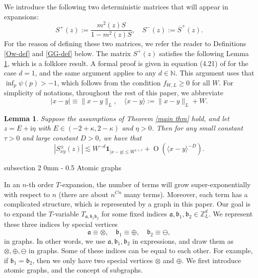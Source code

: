 \documentclass{article}
\makeatletter
\newcommand{\1}{\mathds{1}}
\numberwithin{equation}{section}
\newcommand{\be}{\begin{equation}}
\newcommand{\ee}{\end{equation}}
\newcommand{\fa}{{\mathfrak a}}
\newcommand{\fb}{{\mathfrak b}}
\newcommand{\ii}{\mathrm{i}} %
\renewcommand{\leq}{\leqslant}
\renewcommand{\geq}{\geqslant}
\renewcommand{\le}{\leq}
\renewcommand{\ge}{\geq}
\newcommand{\N}{\mathbb{N}}
\newcommand{\Z}{\mathbb{Z}}
\DeclareMathOperator{\OO}{O}
\theoremstyle{plain} %
\newtheorem{lemma}[theorem]{Lemma}
\theoremstyle{remark}
\renewcommand{\subsection}{\@startsection
	{subsection}%
	{2}%
	{0mm}%
	{-\baselineskip}%
	{0.5\baselineskip}%
	{\normalfont\bf\itshape}} %
\makeatother
\begin{document}
We introduce the following two deterministic matrices that will appear in expansions:
\be\label{Thetapm2}
S^+(z):=\frac{m^2(z) S}{1-m^2(z) S}, \quad S^-(z):=\overline S^+(z) . 
\ee
For the reason of defining these two matrices, we refer the reader to Definitions \ref{Ow-def} and \ref{GG-def} below. The matrix $S^+(z)$ satisfies the following Lemma \ref{lem deter}, which is a folklore result. A formal proof is given in equation (4.21) of \cite{PartII} for the case $d=1$, and the same argument applies to any $d\in \N$. This argument uses that $\inf_{p}\psi(p)>-1$, which follows from the condition $f_{W,L}\ge 0$ for all $W$.
For simplicity of notations, throughout the rest of this paper, we abbreviate 
\be\label{Japanesebracket} |x-y|\equiv \|x-y\|_L,\quad \langle x-y \rangle := \|x-y\|_L + W.\ee

\begin{lemma} \label{lem deter}
	Suppose the assumptions of Theorem \ref{main thm} hold, and let $z=E+\ii\eta$ with $E\in (-2+\kappa,2-\kappa)$ and $\eta>0$. Then for any small constant $\tau>0$ and large constant $D>0$, we have that
	\be\label{S+xy}|S^\pm_{xy}(z)| \lesssim    W^{-d}\mathbf 1_{|x-y| \le W^{1+\tau}} + \OO\left(\langle x-y\rangle^{-D}\right). \ee 
\end{lemma}





\subsection{Atomic graphs} \label{unisec}


In an $n$-th order $T$-expansion, the number of terms will grow super-exponentially with respect to $n$ (there are about $ n^{Cn}$ many terms).  Moreover, each term has a complicated structure, which is represented by a graph in this paper. Our goal is to expand the $T$-variable $T_{\fa,\fb_1 \fb_2}$ for some fixed indices $\fa, \fb_1,\fb_2 \in \Z_L^d$. We represent these three indices by special vertices
\be\label{rep_abc}\fa\equiv \otimes, \quad \fb_1\equiv \oplus, \quad \fb_2\equiv \ominus,\ee
in graphs. In other words, we use $\fa,\fb_1,\fb_2$ in expressions, and draw them as $\otimes,\oplus,\ominus$ in graphs. Some of these indices can be equal to each other. For example, if $\fb_1=\fb_2$, then we only have two special vertices $\otimes$ and $\oplus$. 
We first introduce atomic graphs, and the concept of subgraphs. %
\end{document}
